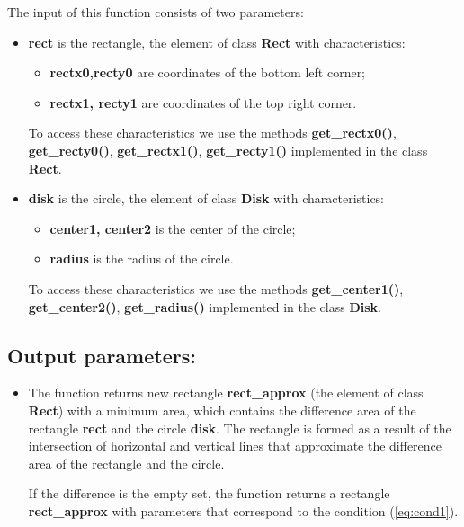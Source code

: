 \documentclass{report}
\begin{document}
The input of this function consists of two parameters:

\begin{itemize}
	\item {\bfseries	rect} is the rectangle, the element of class {\bfseries Rect} with characteristics:
	\begin{itemize}
		\item {\bfseries rectx0,recty0} are coordinates of the bottom left corner;
		\item {\bfseries rectx1, recty1} are coordinates of the top right corner.
	\end{itemize}
	
	To access these characteristics we use the methods  {\bfseries get\_rectx0()}, {\bfseries get\_recty0()}, {\bfseries get\_rectx1()}, {\bfseries get\_recty1()} implemented in the class {\bfseries Rect}.
	
	\item {\bfseries disk}  is the circle, the element of class {\bfseries Disk} with characteristics:
	\begin{itemize}
		\item {\bfseries center1, center2}  is the center of the circle;
		\item {\bfseries radius}  is  the radius of the circle.
	\end{itemize}
	
	To access these characteristics we use the methods {\bfseries get\_center1()}, {\bfseries get\_center2()}, {\bfseries get\_radius()} implemented in the class {\bfseries Disk}.
\end{itemize}

\subsection*{Output parameters:}

\begin{itemize}
	\item The function returns new rectangle {\bfseries rect\_approx} (the element of class {\bfseries Rect}) with a minimum area, which contains the difference area of the rectangle {\bfseries rect} and the circle {\bfseries disk}. The rectangle is formed as a result of the intersection of horizontal and vertical lines that approximate the difference area of the rectangle and the circle.
	
	If the difference is the empty set, the function returns a rectangle {\bfseries rect\_approx} with parameters that correspond to the condition (\ref{eq:cond1}).
	
\end{itemize}
\end{document}
